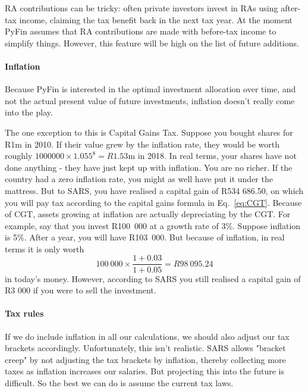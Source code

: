 \documentclass[a4paper, justified]{tufte-handout}
\begin{document}
RA contributions can be tricky: often private investors invest in RAs using after-tax income, claiming the tax benefit back in the next tax year. At the moment PyFin assumes that RA contributions are made with before-tax income to simplify things. However, this feature will be high on the list of future additions.

\paragraph{Inflation} Because PyFin is interested in the optimal investment allocation over time, and not the actual present value of future investments, inflation doesn't really come into the play.

The one exception to this is Capital Gains Tax. Suppose you bought shares for R1m in 2010. If their value grew by the inflation rate, they would be worth roughly $1000000\times1.055^8 = R1.53$m in 2018. In real terms, your shares have not done anything - they have just kept up with inflation. You are no richer. If the country had a zero inflation rate, you might as well have put it under the mattress. But to SARS, you have realised a capital gain of R534 686.50, on which you will pay tax according to the capital gains formula in Eq.~\ref{eq:CGT}. Because of CGT, assets growing at inflation are actually depreciating by the CGT. For example, say that you invest R100~000 at a growth rate of 3\%. Suppose inflation is 5\%. After a year, you will have R103~000. But because of inflation, in real terms it is only worth 
\begin{equation}
100~000 \times \frac{1+0.03}{1+0.05} = R98~095.24
\end{equation}
in today's money. However, according to SARS you still realised a capital gain of R3 000 if you were to sell the investment.

\paragraph{Tax rules} \label{tax rules}
If we do include inflation in all our calculations, we should also adjust our tax brackets accordingly. Unfortunately, this isn't realistic. SARS allows "bracket creep" by not adjusting the tax brackets by inflation, thereby collecting more taxes as inflation increases our salaries. But projecting this into the future is difficult. So the best we can do is assume the current tax laws.
\end{document}
